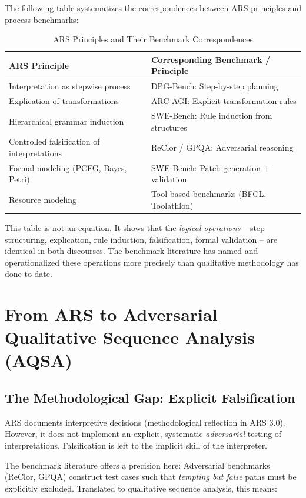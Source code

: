 \documentclass[12pt,a4paper]{article}
\begin{document}
The following table systematizes the correspondences between ARS principles and process benchmarks:

\begin{table}[H]
\centering
\caption{ARS Principles and Their Benchmark Correspondences}
\label{tab:mapping}
\begin{tabular}{@{}p{}p{}@{}}
\toprule
ARS Principle & Corresponding Benchmark / Principle \\
\midrule
Interpretation as stepwise process & DPG-Bench: Step-by-step planning \\
Explication of transformations & ARC-AGI: Explicit transformation rules \\
Hierarchical grammar induction & SWE-Bench: Rule induction from structures \\
Controlled falsification of interpretations & ReClor / GPQA: Adversarial reasoning \\
Formal modeling (PCFG, Bayes, Petri) & SWE-Bench: Patch generation + validation \\
Resource modeling & Tool-based benchmarks (BFCL, Toolathlon) \\
\bottomrule
\end{tabular}
\end{table}

This table is not an equation. It shows that the \textit{logical operations} – step structuring, explication, rule induction, falsification, formal validation – are identical in both discourses. The benchmark literature has named and operationalized these operations more precisely than qualitative methodology has done to date.

\section{From ARS to Adversarial Qualitative Sequence Analysis (AQSA)}

\subsection{The Methodological Gap: Explicit Falsification}

ARS documents interpretive decisions (methodological reflection in ARS 3.0). However, it does not implement an explicit, systematic \textit{adversarial} testing of interpretations. Falsification is left to the implicit skill of the interpreter.

The benchmark literature offers a precision here: Adversarial benchmarks (ReClor, GPQA) construct test cases such that \textit{tempting but false} paths must be explicitly excluded. Translated to qualitative sequence analysis, this means:
\end{document}
